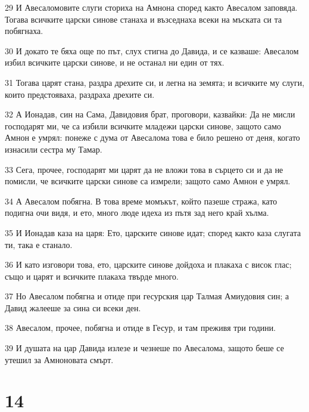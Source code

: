\par 29 И Авесаломовите слуги сториха на Амнона според както Авесалом заповяда. Тогава всичките царски синове станаха и възседнаха всеки на мъската си та побягнаха.
\par 30 И докато те бяха още по път, слух стигна до Давида, и се казваше: Авесалом избил всичките царски синове, и не останал ни един от тях.
\par 31 Тогава царят стана, раздра дрехите си, и легна на земята; и всичките му слуги, които предстояваха, раздраха дрехите си.
\par 32 А Ионадав, син на Сама, Давидовия брат, проговори, казвайки: Да не мисли господарят ми, че са избили всичките младежи царски синове, защото само Амнон е умрял: понеже с дума от Авесалома това е било решено от деня, когато изнасили сестра му Тамар.
\par 33 Сега, прочее, господарят ми царят да не вложи това в сърцето си и да не помисли, че всичките царски синове са измрели; защото само Амнон е умрял.
\par 34 А Авесалом побягна. В това време момъкът, който пазеше стража, като подигна очи видя, и ето, много люде идеха из пътя зад него край хълма.
\par 35 И Ионадав каза на царя: Ето, царските синове идат; според както каза слугата ти, така е станало.
\par 36 И като изговори това, ето, царските синове дойдоха и плакаха с висок глас; също и царят и всичките плакаха твърде много.
\par 37 Но Авесалом побягна и отиде при гесурския цар Талмая Амиудовия син; а Давид жалееше за сина си всеки ден.
\par 38 Авесалом, прочее, побягна и отиде в Гесур, и там преживя три години.
\par 39 И душата на цар Давида излезе и чезнеше по Авесалома, защото беше се утешил за Амноновата смърт.

\chapter{14}

